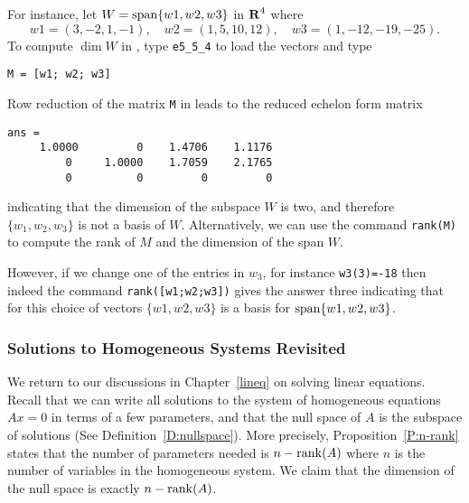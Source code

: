 \documentclass{ximera}
\begin{document}
For instance, let $W={\rm span}\{w1,w2,w3\}$ in $\mbox{$\bf{R}$}^4$ where
\begin{equation*} \label{eq:vectors}
w1 = (3, -2, 1,-1), \quad w2 = (1,5,10,12), \quad
w3 = (1,-12,-19,-25).
\end{equation*}%
To compute $\dim W$ in \Matlab, type \verb+e5_5_4+ to load the
vectors and type
\begin{verbatim}
M = [w1; w2; w3]
\end{verbatim}
Row reduction of the matrix {\tt M} in \Matlab
leads to the reduced echelon form matrix
\begin{verbatim}
ans =
     1.0000         0    1.4706    1.1176
         0     1.0000    1.7059    2.1765
         0          0         0         0
\end{verbatim}
indicating that the dimension of the subspace $W$ is two, and
therefore $\{w_1,w_2,w_3\}$ is not a basis of $W$. Alternatively,
we can use the \Matlab command {\tt rank(M)}
to compute the rank of $M$ and the dimension of the span $W$.

However, if we change one of the entries in $w_3$, for instance
{\tt w3(3)=-18} then indeed the command {\tt rank([w1;w2;w3])}
gives the answer three indicating that for this choice of vectors
$\{w1,w2,w3\}$ is a basis for ${\rm span}\{w1,w2,w3\}$.

\subsubsection*{Solutions to Homogeneous Systems Revisited}

We return to our discussions in Chapter~\ref{lineq} on solving
linear equations.  Recall that we can write all solutions to
the system of homogeneous equations $Ax=0$ in terms of a few
parameters, and that the null space of $A$ is the subspace of
solutions (See Definition~\ref{D:nullspace}).
More precisely, Proposition~\ref{P:n-rank} states that the number of
parameters needed is $n-{\rm rank}(A)$ where $n$ is the number of
variables in the homogeneous system.  We claim that the dimension
of the null space is exactly
$n - {\rm rank}(A)$.
\end{document}
